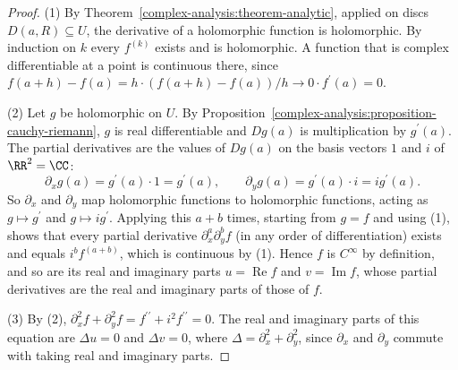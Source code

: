 \begin{proof}
(1) By Theorem~\ref{complex-analysis:theorem-analytic}, applied on discs $D(a, R) \subseteq U$, the derivative of a holomorphic function is holomorphic. By induction on $k$ every $f^{(k)}$ exists and is
holomorphic. A function that is complex differentiable at a point is continuous there, since $f(a + h) - f(a) = h \cdot (f(a + h) - f(a))/h \to 0 \cdot f^{\prime}(a) = 0$.

(2) Let $g$ be holomorphic on $U$. By Proposition~\ref{complex-analysis:proposition-cauchy-riemann}, $g$ is real differentiable and $Dg(a)$ is multiplication by $g^{\prime}(a)$. The partial derivatives are
the values of $Dg(a)$ on the basis vectors $1$ and $i$ of $\RR^2 = \CC$:
\[
\partial_xg(a) = g^{\prime}(a) \cdot 1 = g^{\prime}(a), \qquad \partial_yg(a) = g^{\prime}(a) \cdot i = ig^{\prime}(a).
\]
So $\partial_x$ and $\partial_y$ map holomorphic functions to holomorphic functions, acting as $g \mapsto g^{\prime}$ and $g \mapsto ig^{\prime}$. Applying this $a + b$ times, starting from $g = f$ and using
(1), shows that every partial derivative $\partial_x^a\partial_y^bf$ (in any order of differentiation) exists and equals $i^bf^{(a + b)}$, which is continuous by (1). Hence $f$ is $C^\infty$ by
definition, and so are its real and imaginary parts $u = \operatorname{Re}f$ and $v = \operatorname{Im}f$, whose partial derivatives are the real and imaginary parts of those of $f$.

(3) By (2), $\partial_x^2f + \partial_y^2f = f^{\prime\prime} + i^2f^{\prime\prime} = 0$. The real and imaginary parts of this equation are $\Delta u = 0$ and $\Delta v = 0$, where
$\Delta = \partial_x^2 + \partial_y^2$, since $\partial_x$ and $\partial_y$ commute with taking real and imaginary parts.
\end{proof}

